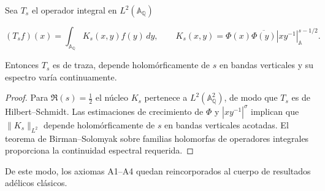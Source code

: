 \begin{lemma}\label{lem:A4-paper}
Sea $T_s$ el operador integral en $L^2(\mathbb{A}_\mathbb{Q})$

\[
  (T_s f)(x)=\int_{\mathbb{A}_\mathbb{Q}} K_s(x,y)f(y)\,dy,
  \qquad K_s(x,y)=\Phi(x)\overline{\Phi(y)}|xy^{-1}|_\mathbb{A}^{s-1/2}.
\]

Entonces $T_s$ es de traza, depende holomórficamente de $s$ en bandas verticales
y su espectro varía continuamente.
\end{lemma}

\begin{proof}
Para $\Re(s)=\tfrac{1}{2}$ el núcleo $K_s$ pertenece a $L^2(\mathbb{A}_\mathbb{Q}^2)$, de
modo que $T_s$ es de Hilbert--Schmidt.  Las estimaciones de crecimiento de $\Phi$
y $|xy^{-1}|^{\sigma}$ implican que $\|K_s\|_{L^2}$ depende holomórficamente de $s$
en bandas verticales acotadas.  El teorema de Birman--Solomyak sobre
familias holomorfas de operadores integrales
\cite[Thm.~1]{BirmanSolomyak1967}
proporciona la continuidad espectral requerida.
\end{proof}

De este modo, los axiomas A1--A4 quedan reincorporados al cuerpo de resultados
adélicos clásicos.
